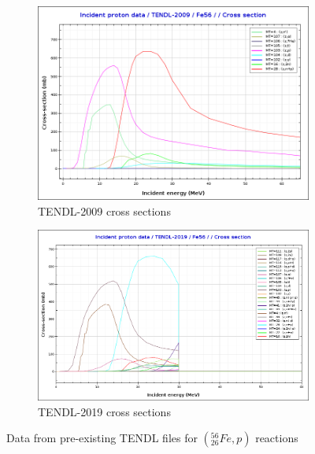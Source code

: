 \begin{figure}[htb]
\centering
\begin{subfigure}{0.9\textwidth}
  \includegraphics[width=\linewidth]{chapters/activity_code/tendl-fe56/tendl_2009_p_fe56.png}
  \caption{TENDL-2009 cross sections}
  \label{fig:xsdata-tendl2009}
\end{subfigure}
\begin{subfigure}{0.9\textwidth}
  \includegraphics[width=\linewidth]{chapters/activity_code/tendl-fe56/tendl_2019_p_fe56.png}
  \caption{TENDL-2019 cross sections}
  \label{fig:xsdata-tendl2019}
\end{subfigure}
\caption{Data from pre-existing TENDL files for $({}^{56}_{26}Fe, p)$ reactions}
\label{fig:xsdata-particle}
\end{figure}


